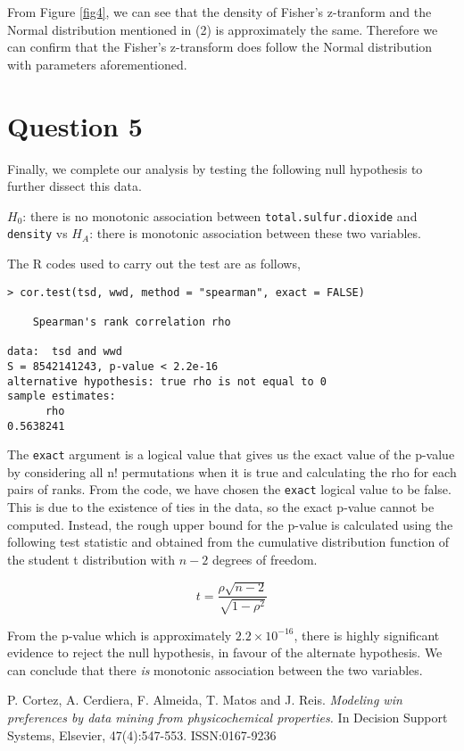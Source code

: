 \documentclass[11pt,a4]{article}
\begin{document}
\bigskip

From Figure \ref{fig4}, we can see that the density of Fisher’s z-tranform and the Normal distribution mentioned in (2) is approximately the same. Therefore we can confirm that the Fisher’s z-transform does follow the Normal distribution with parameters aforementioned.

\bigskip

\section{Question 5}
Finally, we complete our analysis by testing the following null hypothesis to further dissect this data. 

\bigskip

$H_{0}$: there is no monotonic association between \verb|total.sulfur.dioxide| and \verb|density| 
vs $H_{A}$: there is monotonic association between these two variables.

\bigskip

The R codes used to carry out the test are as follows,

\begin{verbatim}
> cor.test(tsd, wwd, method = "spearman", exact = FALSE)

	Spearman's rank correlation rho

data:  tsd and wwd
S = 8542141243, p-value < 2.2e-16
alternative hypothesis: true rho is not equal to 0
sample estimates:
      rho 
0.5638241 
\end{verbatim}

The \verb|exact| argument is a logical value that gives us the exact value of the p-value by considering all n! permutations when it is true and calculating the rho for each pairs of ranks. From the code, we have chosen the \verb|exact| logical value to be false.  This is due to the existence of ties in the data, so the exact p-value cannot be computed. Instead, the rough upper bound for the p-value is calculated using the following test statistic and obtained from the cumulative distribution function of the student t distribution with $n - 2$ degrees of freedom.

\bigskip

\[t = \frac{\rho \sqrt{n-2}}{\sqrt{1- \rho^2}}\]

\bigskip
From the p-value which is approximately $2.2\times 10^{-16}$,
there is highly significant evidence to reject the null hypothesis, in favour of the alternate hypothesis. We can conclude that there \emph{is} monotonic association between the two variables.  

\bigskip

\begin{thebibliography}{}
P. Cortez, A. Cerdiera, F. Almeida, T. Matos and J. Reis. {\it Modeling win preferences by data mining from physicochemical properties.} In Decision Support Systems, Elsevier, 47(4):547-553.
ISSN:0167-9236
\cite{CCKT}

\end{thebibliography}
\end{document}
